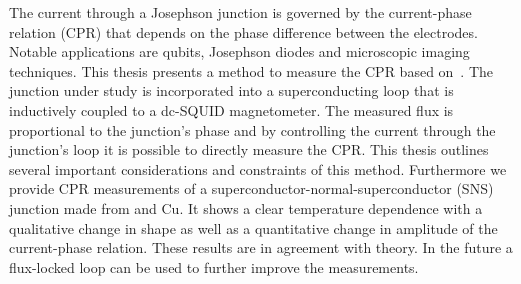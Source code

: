 The current through a Josephson junction is governed by the current-phase relation (CPR) that depends on the phase difference between the electrodes. Notable applications are qubits, Josephson diodes and microscopic imaging techniques. This thesis presents a method to measure the CPR based on~\cite{frolovMeasurementCurrentPhaseRelation2004}. The junction under study is incorporated into a superconducting loop that is inductively coupled to a dc-SQUID magnetometer. The measured flux is proportional to the junction's phase and by controlling the current through the junction's loop it is possible to directly measure the CPR. This thesis outlines several important considerations and constraints of this method. Furthermore we provide CPR measurements of a superconductor-normal-superconductor (SNS) junction made from  and {Cu}. It shows a clear temperature dependence with a qualitative change in shape as well as a quantitative change in amplitude of the current-phase relation. These results are in agreement with theory. In the future a flux-locked loop can be used to further improve the measurements.